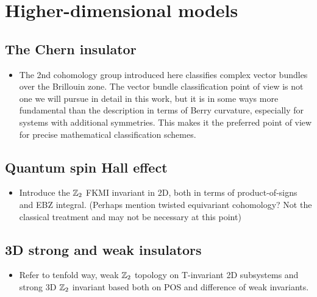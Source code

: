 \label{sec:symm-classes}


\section{Higher-dimensional models}\label{sec:insulators}

\subsection{The Chern insulator}\label{sec:Chern}

{\color{blue}
\begin{itemize}
	\item The 2nd cohomology group introduced here classifies complex vector bundles over the Brillouin zone. The vector bundle classification point of view is not one we will pursue in detail in this work, but it is in some ways more fundamental than the description in terms of Berry curvature, especially for systems with additional symmetries. This makes it the preferred point of view for precise mathematical classification schemes.
\end{itemize}	
}

\subsection{Quantum spin Hall effect}\label{sec:QSHE}

{\color{blue}
\begin{itemize}
	\item Introduce the $\mathbb{Z}_2$ FKMI invariant in 2D, both in terms of product-of-signs and EBZ integral. (Perhaps mention twisted equivariant cohomology? Not the classical treatment and may not be necessary at this point)
\end{itemize}
}

\subsection{3D strong and weak insulators}\label{sec:3D-Z2}

{\color{blue}
\begin{itemize}
	\item Refer to tenfold way, weak $\mathbb{Z}_2$ topology on T-invariant 2D subsystems and strong 3D $\mathbb{Z}_2$ invariant based both on POS and difference of weak invariants.
\end{itemize}
}